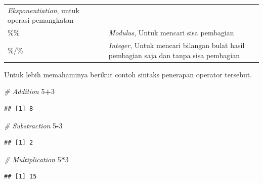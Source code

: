 \documentclass[]{book}
\newenvironment{Shaded}{\begin{snugshade}}{\end{snugshade}}
\newcommand{\DecValTok}[1]{\textcolor[rgb]{0.00,0.00,0.81}{#1}}
\newcommand{\CommentTok}[1]{\textcolor[rgb]{0.56,0.35,0.01}{\textit{#1}}}
\newcommand{\OperatorTok}[1]{\textcolor[rgb]{0.81,0.36,0.00}{\textbf{#1}}}
\begin{document}
\begin{longtable}[]{@{}ll@{}}
\begin{minipage}[t]{0.79\columnwidth}
\emph{Eksponentiation}, untuk operasi pemangkatan\strut
\end{minipage}\tabularnewline
\begin{minipage}[t]{0.15\columnwidth}\raggedright\strut
\%\%\strut
\end{minipage} & \begin{minipage}[t]{0.79\columnwidth}\raggedright\strut
\emph{Modulus}, Untuk mencari sisa pembagian\strut
\end{minipage}\tabularnewline
\begin{minipage}[t]{0.15\columnwidth}\raggedright\strut
\%/\%\strut
\end{minipage} & \begin{minipage}[t]{0.79\columnwidth}\raggedright\strut
\emph{Integer}, Untuk mencari bilangan bulat hasil pembagian saja dan
tanpa sisa pembagian\strut
\end{minipage}\tabularnewline
\bottomrule
\end{longtable}

Untuk lebih memahaminya berikut contoh sintaks penerapan operator
tersebut.

\begin{Shaded}
\begin{Highlighting}[]
\CommentTok{# Addition}
\DecValTok{5}\OperatorTok{+}\DecValTok{3}
\end{Highlighting}
\end{Shaded}

\begin{verbatim}
## [1] 8
\end{verbatim}

\begin{Shaded}
\begin{Highlighting}[]
\CommentTok{# Substraction}
\DecValTok{5}\OperatorTok{-}\DecValTok{3}
\end{Highlighting}
\end{Shaded}

\begin{verbatim}
## [1] 2
\end{verbatim}

\begin{Shaded}
\begin{Highlighting}[]
\CommentTok{# Multiplication}
\DecValTok{5}\OperatorTok{*}\DecValTok{3}
\end{Highlighting}
\end{Shaded}

\begin{verbatim}
## [1] 15
\end{verbatim}
\end{document}
